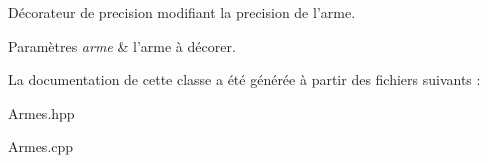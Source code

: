 Décorateur de precision modifiant la precision de l'arme. 


\begin{DoxyParams}{Paramètres}
{\em arme} & l'arme à décorer. \\
\hline
\end{DoxyParams}


La documentation de cette classe a été générée à partir des fichiers suivants \-:\begin{DoxyCompactItemize}
\item 
Armes.\-hpp\item 
Armes.\-cpp\end{DoxyCompactItemize}
